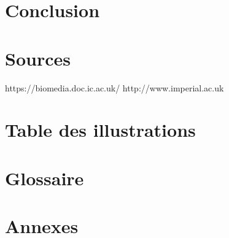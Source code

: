 \documentclass[10pt]{report}
\begin{document}
\chapter*{Conclusion} %
\chapter*{Sources}
https://biomedia.doc.ic.ac.uk/
http://www.imperial.ac.uk
\chapter*{Table des illustrations}
\chapter*{Glossaire}
\chapter*{Annexes}
\end{document}
